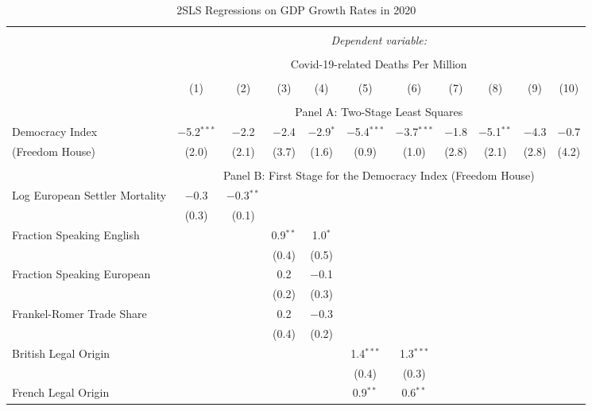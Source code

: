 
\begin{table}[!htbp] \centering
  \caption{2SLS Regressions on GDP Growth Rates in 2020}
  \label{tab:2sls-gdp-continent} 
  \footnotesize
  \begin{threeparttable}
\begin{tabular}{@{\extracolsep{0pt}}lcccccccccc} 
\\[-1.8ex]\hline 
\hline \\[-1.8ex] 
 & \multicolumn{10}{c}{\textit{Dependent variable:}} \\ 
\cline{2-11} 
\\[-1.8ex] & \multicolumn{10}{c}{Covid-19-related Deaths Per Million} \\ 
\\[-1.8ex] & (1) & (2) & (3) & (4) & (5) & (6) & (7) & (8) & (9) & (10)\\ 
\hline \\[-1.8ex] 
  & \multicolumn{10}{c}{Panel A: Two-Stage Least Squares} \\
Democracy Index & $-$5.2$^{***}$ & $-$2.2 & $-$2.4 & $-$2.9$^{*}$ & $-$5.4$^{***}$ & $-$3.7$^{***}$ & $-$1.8 & $-$5.1$^{**}$ & $-$4.3 & $-$0.7 \\ 
(Freedom House)   & (2.0) & (2.1) & (3.7) & (1.6) & (0.9) & (1.0) & (2.8) & (2.1) & (2.8) & (4.2) \\ 
\hline \\[-1.8ex] 
   & \multicolumn{10}{c}{Panel B: First Stage for the Democracy Index (Freedom House)} \\
  Log European Settler Mortality & $-$0.3 & $-$0.3$^{**}$ &  &  &  &  &  &  &  &  \\ 
  & (0.3) & (0.1) &  &  &  &  &  &  &  &  \\ 
  Fraction Speaking English &  &  & 0.9$^{**}$ & 1.0$^{*}$ &  &  &  &  &  &  \\ 
  &  &  & (0.4) & (0.5) &  &  &  &  &  &  \\ 
  Fraction Speaking European &  &  & 0.2 & $-$0.1 &  &  &  &  &  &  \\ 
  &  &  & (0.2) & (0.3) &  &  &  &  &  &  \\ 
  Frankel-Romer Trade Share &  &  & 0.2 & $-$0.3 &  &  &  &  &  &  \\ 
  &  &  & (0.4) & (0.2) &  &  &  &  &  &  \\ 
  British Legal Origin &  &  &  &  & 1.4$^{***}$ & 1.3$^{***}$ &  &  &  &  \\ 
  &  &  &  &  & (0.4) & (0.3) &  &  &  &  \\ 
  French Legal Origin &  &  &  &  & 0.9$^{**}$ & 0.6$^{**}$ &  &  &  &  \\ 

\end{tabular}
\end{threeparttable}
\end{table}
